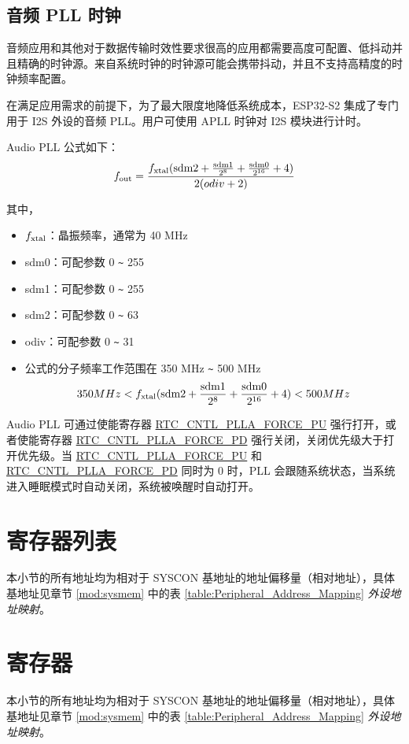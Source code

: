 \documentclass[main\_\_CN.tex]{subfiles}
\begin{document}
\subsection{音频 PLL 时钟}\label{audiopll}
音频应用和其他对于数据传输时效性要求很高的应用都需要高度可配置、低抖动并且精确的时钟源。来自系统时钟的时钟源可能会携带抖动，并且不支持高精度的时钟频率配置。

在满足应用需求的前提下，为了最大限度地降低系统成本，ESP32-S2 集成了专门用于 I2S 外设的音频 PLL。用户可使用 APLL 时钟对 I2S 模块进行计时。

Audio PLL 公式如下：
$$f_{\rm{out}} = \frac{f_{\rm{xtal}}(\rm{sdm2}+\frac{\rm{sdm1}}{2^8}+\frac{\rm{sdm0}}{2^{16}}+4)}{2(odiv+2)} $$

其中，
\begin{itemize}
    \item \begin{math}f_{\rm{xtal}}\end{math}：晶振频率，通常为 40 MHz
    \item sdm0：可配参数 0 \verb+~+ 255
    \item sdm1：可配参数 0 \verb+~+ 255
    \item sdm2：可配参数 0 \verb+~+ 63
    \item odiv：可配参数 0 \verb+~+ 31
    \item 公式的分子频率工作范围在 350 MHz \verb+~+ 500 MHz
$$ 350MHz<{f_{\rm{xtal}}(\rm{sdm2}+\frac{\rm{sdm1}}{2^8}+\frac{\rm{sdm0}}{2^{16}}+4)}<500MHz $$
\end{itemize}

Audio PLL 可通过使能寄存器 \hyperref[fielddesc:RTCCNTLPLLAFORCEPU]{RTC\_CNTL\_PLLA\_FORCE\_PU} 强行打开，或者使能寄存器 \hyperref[fielddesc:RTCCNTLPLLAFORCEPD]{RTC\_CNTL\_PLLA\_FORCE\_PD} 强行关闭，关闭优先级大于打开优先级。当 \hyperref[fielddesc:RTCCNTLPLLAFORCEPU]{RTC\_CNTL\_PLLA\_FORCE\_PU} 和 \hyperref[fielddesc:RTCCNTLPLLAFORCEPD]{RTC\_CNTL\_PLLA\_FORCE\_PD} 同时为 0 时，PLL 会跟随系统状态，当系统进入睡眠模式时自动关闭，系统被唤醒时自动打开。

\section{寄存器列表}\label{sec:resclk-reg-summ}

本小节的所有地址均为相对于 SYSCON 基地址的地址偏移量（相对地址），具体基地址见章节 \ref{mod:sysmem} \textit{} 中的表 \ref{table:Peripheral_Address_Mapping} \textit{外设地址映射}。



\section{寄存器}\label{sec:resclk-reg-desc}

本小节的所有地址均为相对于 SYSCON 基地址的地址偏移量（相对地址），具体基地址见章节 \ref{mod:sysmem} \textit{} 中的表 \ref{table:Peripheral_Address_Mapping} \textit{外设地址映射}。


\end{document}
